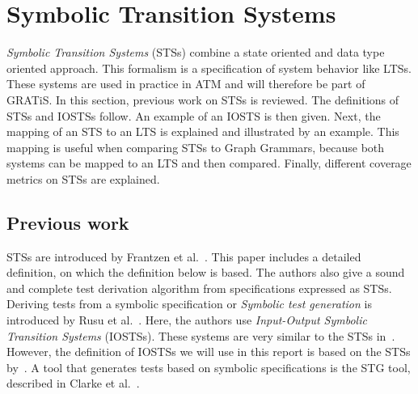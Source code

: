 \section{Symbolic Transition Systems}\label{sec:symbolic}
\textit{Symbolic Transition Systems} (STSs) combine a state oriented and data type oriented approach. This formalism is a specification of system behavior like LTSs. These systems are used in practice in ATM and will therefore be part of GRATiS. In this section, previous work on STSs is reviewed. The definitions of STSs and IOSTSs follow. An example of an IOSTS is then given. Next, the mapping of an STS to an LTS is explained and illustrated by an example. This mapping is useful when comparing STSs to Graph Grammars, because both systems can be mapped to an LTS and then compared. Finally, different coverage metrics on STSs are explained.

\subsection{Previous work}
STSs are introduced by Frantzen et al.~\cite{Frantzen:Symbolic}. This paper includes a detailed definition, on which the definition below is based. The authors also give a sound and complete test derivation algorithm from specifications expressed as STSs. Deriving tests from a symbolic specification or \textit{Symbolic test generation} is introduced by Rusu et al.~\cite{rusu:symbolic}. Here, the authors use \textit{Input-Output Symbolic Transition Systems} (IOSTSs). These systems are very similar to the STSs in~\cite{Frantzen:Symbolic}. However, the definition of IOSTSs we will use in this report is based on the STSs by~\cite{Frantzen:Symbolic}. A tool that generates tests based on symbolic specifications is the STG tool, described in Clarke et al.~\cite{clarke:STG}.

